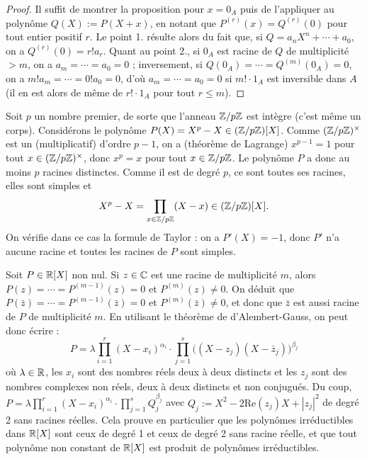 \documentclass[]{report}
\begin{document}
\begin{proof}
    Il suffit de montrer la proposition pour $x = 0_A$ puis de l'appliquer au polynôme $Q(X) := P(X + x)$, en notant que $P^{(r)}(x) = Q^{(r)}(0)$ pour tout entier positif $r$. Le point 1. résulte alors du fait que, si $Q = a_n X^n + \cdots + a_0$, on a $Q^{(r)}(0) = r!a_r$. Quant au point 2., si $0_A$ est racine de $Q$ de multiplicité $> m$, on a $a_m = \cdots = a_0 = 0$ ; inversement, si $Q(0_A) = \cdots = Q^{(m)}(0_A) = 0$, on a $m!a_m = \cdots = 0!a_0 = 0$, d'où $a_m = \cdots = a_0 = 0$ si $m! \cdot 1_A$ est inversible dans $A$ (il en est alors de même de $r! \cdot 1_A$ pour tout $r \le m$).
\end{proof}

\begin{ex}{}{}
    Soit $p$ un nombre premier, de sorte que l'anneau $\mathbb{Z}/p\mathbb{Z}$ est intègre (c'est même un corps). Considérons le polynôme $P(X) = X^p - X \in (\mathbb{Z}/p\mathbb{Z})[X]$. Comme $(\mathbb{Z}/p\mathbb{Z})^{\times}$ est un \gr (multiplicatif) d'ordre $p - 1$, on a (théorème de Lagrange) $x^{p-1} = 1$ pour tout $x \in (\mathbb{Z}/p\mathbb{Z})^{\times}$, donc $x^p = x$ pour tout $x \in \mathbb{Z}/p\mathbb{Z}$. Le polynôme $P$ a donc au moins $p$ racines distinctes. Comme il est de degré $p$, ce sont toutes ses racines, elles sont simples et
    \[X^p - X = \prod_{x \in \mathbb{Z}/p\mathbb{Z}}(X - x) \in (\mathbb{Z}/p\mathbb{Z})[X].\]
    On vérifie dans ce cas la formule de Taylor : on a $P'(X) = -1$, donc $P'$ n'a aucune racine et toutes les racines de $P$ sont simples.
\end{ex}

\begin{ex}{}{}
    Soit $P \in \mathbb{R}[X]$ non nul. Si $z \in \mathbb{C}$ est une racine de multiplicité $m$, alors $P(z) = \cdots = P^{(m-1)}(z) = 0$ et $P^{(m)}(z) \neq 0$. On déduit que $P(\bar{z}) = \cdots = P^{(m-1)}(\bar{z}) = 0$ et $P^{(m)}(\bar{z}) \neq 0$, et donc que $\bar{z}$ est aussi racine de $P$ de multiplicité $m$. En utilisant le théorème de d'Alembert-Gauss, on peut donc écrire :
    \[P = \lambda \prod_{i = 1}^{r}(X - x_i)^{\alpha_i} \cdot \prod_{j = 1}^{s}\big((X - z_j)(X - \bar{z}_j)\big)^{\beta_j}\]
    où $\lambda \in \mathbb{R}$, les $x_i$ sont des nombres réels deux à deux distincts et les $z_j$ sont des nombres complexes non réels, deux à deux distincts et non conjugués. Du coup, $P = \lambda \prod_{i=1}^{r}(X - x_i)^{\alpha_i} \cdot \prod_{j=1}^{s}Q_j^{\beta_j}$ avec $Q_j := X^2 - 2\mathrm{Re}(z_j)X + |z_j|^2$ de degré 2 sans racines réelles. Cela prouve en particulier que les polynômes irréductibles dans $\mathbb{R}[X]$ sont ceux de degré 1 et ceux de degré 2 sans racine réelle, et que tout polynôme non constant de $\mathbb{R}[X]$ est produit de polynômes irréductibles.
\end{ex}
\end{document}

